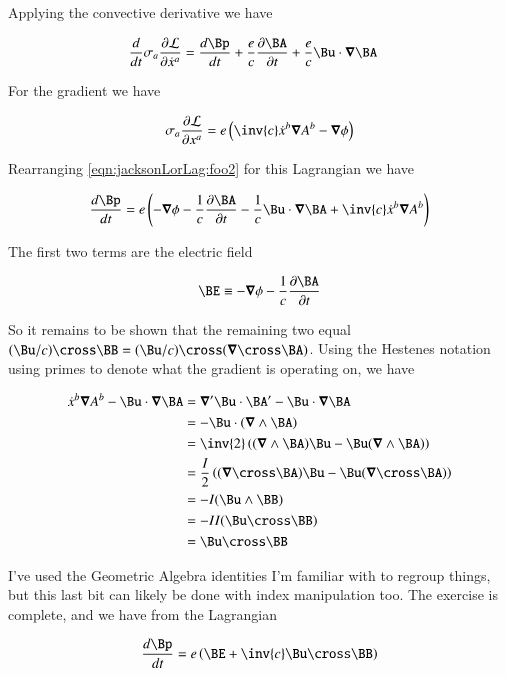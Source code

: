 Applying the convective derivative we have

\begin{align*}
\frac{d}{dt} 
\sigma_a \frac{\partial \LL}{\partial \xdot^a}
&=
\frac{d\Bp}{dt} 
+ \frac{e}{c} \frac{\partial \BA}{\partial t}
+ \frac{e}{c} \Bu \cdot \spacegrad \BA
\end{align*}

For the gradient we have

\begin{align*}
\sigma_a \frac{\partial \LL}{\partial x^a} = e\left( \inv{c}\xdot^b \spacegrad A^b - \spacegrad \phi \right)
\end{align*}

Rearranging \ref{eqn:jacksonLorLag:foo2} for this Lagrangian we have

\begin{align*}
\frac{d\Bp}{dt} 
=
e \left( 
- \spacegrad \phi
- \frac{1}{c} \frac{\partial \BA}{\partial t}
- \frac{1}{c} \Bu \cdot \spacegrad \BA
 +\inv{c} \xdot^b \spacegrad A^b 
\right)
\end{align*}

The first two terms are the electric field

\begin{align*}
\BE \equiv
- \spacegrad \phi
- \frac{1}{c} \frac{\partial \BA}{\partial t}
\end{align*}

So it remains to be shown that the remaining two equal $(\Bu/c) \cross \BB = (\Bu/c) \cross (\spacegrad \cross \BA)$.  Using the Hestenes notation using primes to denote what the gradient is operating on, we have

\begin{align*}
\xdot^b \spacegrad A^b - \Bu \cdot \spacegrad \BA
&=
\spacegrad' \Bu \cdot \BA' - \Bu \cdot \spacegrad \BA \\
&=
-\Bu \cdot (\spacegrad \wedge \BA) \\
&=
\inv{2} \left(
(\spacegrad \wedge \BA) \Bu  -
\Bu (\spacegrad \wedge \BA) 
\right) \\
&=
\frac{I}{2} \left(
(\spacegrad \cross \BA) \Bu -
\Bu (\spacegrad \cross \BA) 
\right) \\
&=
-I (\Bu \wedge \BB) \\
&=
-I I (\Bu \cross \BB) \\
&=
\Bu \cross \BB \\
\end{align*}

I've used the Geometric Algebra identities I'm familiar with to regroup things, but this last bit can likely be done with index manipulation too.  The exercise is complete, and we have from the Lagrangian

\begin{align}\label{eqn:jacksonLorLag:foo3}
\frac{d\Bp}{dt} = e \left( \BE + \inv{c} \Bu \cross \BB \right)
\end{align}

\EndArticle
